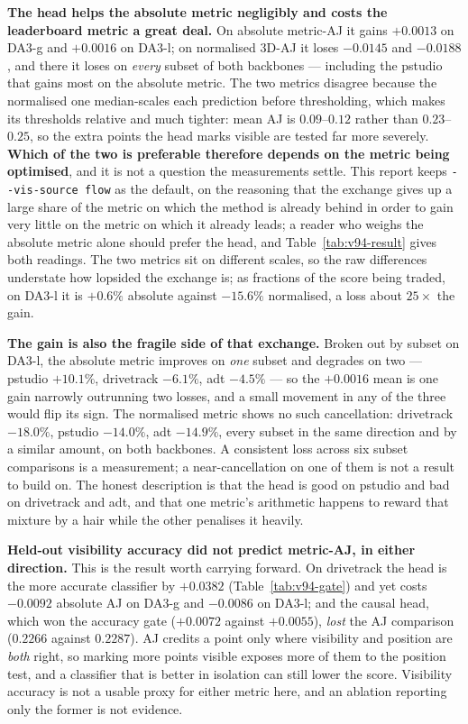 \documentclass[11pt,a4paper]{article}
\begin{document}
\textbf{The head helps the absolute metric negligibly and costs the leaderboard metric a great
deal.} On absolute metric-AJ it gains $+0.0013$ on DA3-g and $+0.0016$ on DA3-l; on normalised
3D-AJ it loses $-0.0145$ and $-0.0188$, and there it loses on \emph{every} subset of both
backbones --- including the pstudio that gains most on the absolute metric. The two metrics
disagree because the normalised one median-scales each prediction before thresholding, which
makes its thresholds relative and much tighter: mean AJ is $0.09$--$0.12$ rather than
$0.23$--$0.25$, so the extra points the head marks visible are tested far more severely.
\textbf{Which of the two is preferable therefore depends on the metric being optimised}, and it
is not a question the measurements settle. This report keeps \texttt{-{}-vis-source flow} as the
default, on the reasoning that the exchange gives up a large share of the metric on which the
method is already behind in order to gain very little on the metric on which it already leads; a
reader who weighs the absolute metric alone should prefer the head, and Table~\ref{tab:v94-result}
gives both readings. The two metrics sit on different
scales, so the raw differences understate how lopsided the exchange is; as fractions of the score
being traded, on DA3-l it is $+0.6\%$ absolute against $-15.6\%$ normalised, a loss about
$25\times$ the gain.

\textbf{The gain is also the fragile side of that exchange.} Broken out by subset on DA3-l, the
absolute metric improves on \emph{one} subset and degrades on two --- pstudio $+10.1\%$,
drivetrack $-6.1\%$, adt $-4.5\%$ --- so the $+0.0016$ mean is one gain narrowly outrunning two
losses, and a small movement in any of the three would flip its sign. The normalised metric shows
no such cancellation: drivetrack $-18.0\%$, pstudio $-14.0\%$, adt $-14.9\%$, every subset in the
same direction and by a similar amount, on both backbones. A consistent loss across six subset
comparisons is a measurement; a near-cancellation on one of them is not a result to build on. The
honest description is that the head is good on pstudio and bad on drivetrack and adt, and that
one metric's arithmetic happens to reward that mixture by a hair while the other penalises it
heavily.

\textbf{Held-out visibility accuracy did not predict metric-AJ, in either direction.} This is the
result worth carrying forward. On drivetrack the head is the more accurate classifier by
$+0.0382$ (Table~\ref{tab:v94-gate}) and yet costs $-0.0092$ absolute AJ on DA3-g and $-0.0086$
on DA3-l; and the causal head, which won the accuracy gate ($+0.0072$ against $+0.0055$),
\emph{lost} the AJ comparison ($0.2266$ against $0.2287$). AJ credits a point only where
visibility and position are \emph{both} right, so marking more points visible exposes more of
them to the position test, and a classifier that is better in isolation can still lower the
score. Visibility accuracy is not a usable proxy for either metric here, and an ablation
reporting only the former is not evidence.
\end{document}
